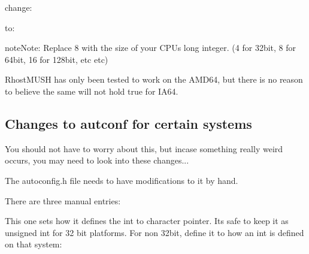 \documentclass[letterpaper,10pt,english]{sphinxmanual}
\begin{document}
\sphinxAtStartPar
change:

\begin{sphinxVerbatim}[commandchars=\\\{\}]
      
              
\end{sphinxVerbatim}

\sphinxAtStartPar
to:

\begin{sphinxVerbatim}[commandchars=\\\{\}]
     
             
\end{sphinxVerbatim}

\begin{sphinxadmonition}{note}{Note:}
\sphinxAtStartPar
Replace 8 with the size of your CPU\textquotesingle{}s long integer. (4 for 32\sphinxhyphen{}bit,
8 for 64\sphinxhyphen{}bit, 16 for 128\sphinxhyphen{}bit, etc etc)
\end{sphinxadmonition}

\sphinxAtStartPar
RhostMUSH has only been tested to work on the AMD64, but there is no
reason to believe the same will not hold true for IA64.


\subsection{Changes to autconf for certain systems}
\label{\detokenize{troubleshooting:changes-to-autconf-for-certain-systems}}
\sphinxAtStartPar
You should not have to worry about this, but incase something really
weird occurs, you may need to look into these changes...

\sphinxAtStartPar
The autoconfig.h file needs to have modifications to it by hand.

\sphinxAtStartPar
There are three manual entries:

\sphinxAtStartPar
This one sets how it defines the int to character pointer.  It\textquotesingle{}s safe
to keep it as \textquotesingle{}unsigned int\textquotesingle{} for 32 bit platforms.  For non 32\sphinxhyphen{}bit,
define it to  how an int is defined on that system:

\begin{sphinxVerbatim}[commandchars=\\\{\}]
      
\end{sphinxVerbatim}
\end{document}
